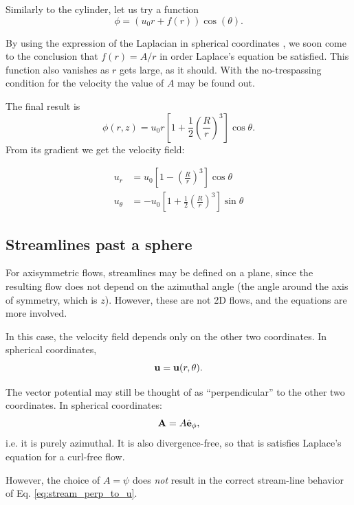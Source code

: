 Similarly to the cylinder, let us try a function
\[
\phi =  \left( u_0 r  + f(r) \right) \cos(\theta)  .
\]

By using the expression of the Laplacian in spherical coordinates
\cite{wiki:del}, we soon come to the conclusion that $f(r)= A/r $ in
order Laplace's equation be satisfied. This function also vanishes as
$r$ gets large, as it should. With the no-trespassing condition for the
velocity the value of $A$ may be found out.

The final result is
\[
  \phi(r,z) = u_0 r
  \left[
    1 +
    \frac12 \left( \frac{R}{r}\right)^3
  \right] \cos\theta .
\]
From its gradient we get the velocity field:

\begin{align*}
u_r &=  u_0
  \left[
    1 -
      \left(\frac{R}{r}\right)^3
  \right] \cos\theta \\
u_\theta &=  -u_0
  \left[
    1 + \frac12
      \left(\frac{R}{r}\right)^3
  \right] \sin\theta
\end{align*}


\subsection{Streamlines past a sphere}

For axisymmetric flows, streamlines may be defined on a plane, since
the resulting flow does not depend on the azimuthal angle (the angle
around the axis of symmetry, which is $z$). However, these are not 2D
flows, and the equations are more involved.

In this case, the velocity field depends only on the other two
coordinates. In spherical coordinates,
\[
  \mathbf{u} = \mathbf{u}(r,\theta) .
\]

The vector potential may still be thought of as ``perpendicular'' to the other
two coordinates. In spherical coordinates:
\[
  \mathbf{A} = A \hat{\mathbf{e}}_\phi ,
\]
i.e. it is purely azimuthal. It is also divergence-free, so that is
satisfies Laplace's equation for a curl-free flow.

However, the choice of $A=\psi$ does \emph{not} result in the correct
stream-line behavior of Eq.  \ref{eq:stream_perp_to_u}.

